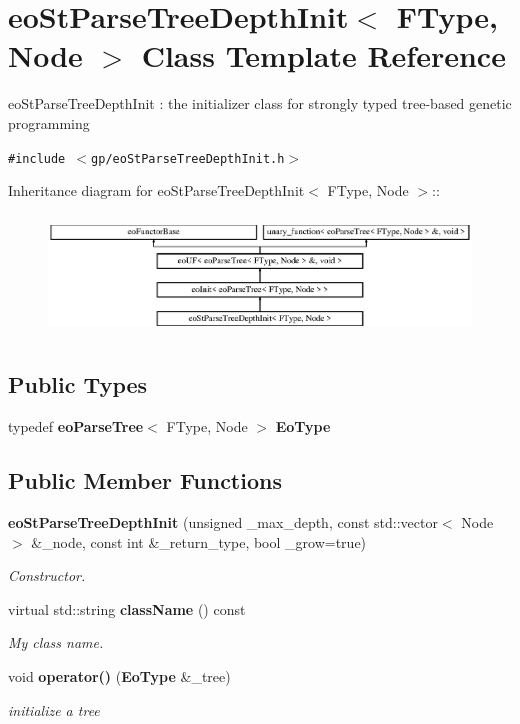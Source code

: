 \section{eo\-St\-Parse\-Tree\-Depth\-Init$<$ FType, Node $>$ Class Template Reference}
\label{classeo_st_parse_tree_depth_init}
eo\-St\-Parse\-Tree\-Depth\-Init : the initializer class for strongly typed tree-based genetic programming  


{\tt \#include $<$gp/eo\-St\-Parse\-Tree\-Depth\-Init.h$>$}

Inheritance diagram for eo\-St\-Parse\-Tree\-Depth\-Init$<$ FType, Node $>$::\begin{figure}[H]
\begin{center}
\leavevmode
\includegraphics[height=3.21839cm]{classeo_st_parse_tree_depth_init}
\end{center}
\end{figure}
\subsection*{Public Types}
\begin{CompactItemize}
\item 
typedef {\bf eo\-Parse\-Tree}$<$ FType, Node $>$ {\bf Eo\-Type}\label{classeo_st_parse_tree_depth_init_w0}

\end{CompactItemize}
\subsection*{Public Member Functions}
\begin{CompactItemize}
\item 
{\bf eo\-St\-Parse\-Tree\-Depth\-Init} (unsigned \_\-max\_\-depth, const std::vector$<$ Node $>$ \&\_\-node, const int \&\_\-return\_\-type, bool \_\-grow=true)
\begin{CompactList}\small\item\em Constructor. \item\end{CompactList}\item 
virtual std::string {\bf class\-Name} () const \label{classeo_st_parse_tree_depth_init_a1}

\begin{CompactList}\small\item\em My class name. \item\end{CompactList}\item 
void {\bf operator()} ({\bf Eo\-Type} \&\_\-tree)
\begin{CompactList}\small\item\em initialize a tree \item\end{CompactList}\end{CompactItemize}
